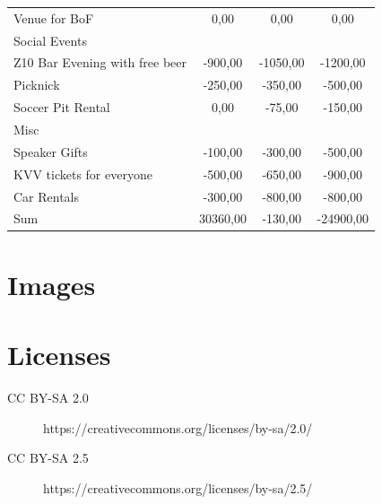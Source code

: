 \documentclass[parskip=half,final,oneside,a4paper,pdftex]{scrartcl}
\def\imagecopyrights{}
\begin{document}
\begin{tabularx}{\linewidth}{XSSS}
\hspace*{1em} Venue for BoF  & 0,00 & 0,00 & 0,00 \\
\hspace*{1em} Social Events  &  &  &  \\
\hspace*{1em} \hspace*{1em} Z10 Bar Evening with free beer & -900,00 & -1050,00 & -1200,00 \\
\hspace*{1em} \hspace*{1em} Picknick & -250,00 & -350,00 & -500,00 \\
\hspace*{1em} \hspace*{1em} Soccer Pit Rental & 0,00 & -75,00 & -150,00 \\
\hspace*{1em} Misc  &  &  &  \\
\hspace*{1em} \hspace*{1em} Speaker Gifts & -100,00 & -300,00 & -500,00 \\
\hspace*{1em} \hspace*{1em} KVV tickets for everyone & -500,00 & -650,00 & -900,00 \\
\hspace*{1em} \hspace*{1em} Car Rentals & -300,00 & -800,00 & -800,00 \\\hline
Sum \hspace*{1em}  & 30360,00 & -130,00 & -24900,00 \\

\end{tabularx}



  \section{Images}
  \begin{enumerate}
    \imagecopyrights
  \end{enumerate}

  \section{Licenses}

  \begin{description}
    \item[CC BY-SA 2.0] https://creativecommons.org/licenses/by-sa/2.0/
    \item[CC BY-SA 2.5] https://creativecommons.org/licenses/by-sa/2.5/
  \end{description}
\end{document}
